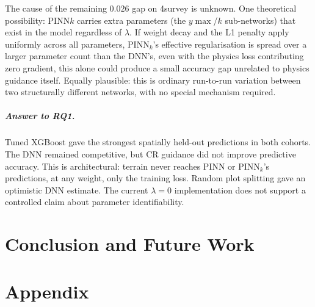 \documentclass[logo,msc,ai]{infthesis}           %
\begin{document}
The cause of the remaining $0.026$ gap on 4survey is unknown. One theoretical possibility: PINN$k$ carries extra parameters (the $y{\max}$/$k$ sub-networks) that exist in the model regardless of $\lambda$. If weight decay and the L1 penalty apply uniformly across all parameters, PINN$_k$'s effective regularisation is spread over a larger parameter count than the DNN's, even with the physics loss contributing zero gradient, this alone could produce a small accuracy gap unrelated to physics guidance itself. Equally plausible: this is ordinary run-to-run variation between two structurally different networks, with no special mechanism required. 

\paragraph*{Answer to RQ1.}
Tuned XGBoost gave the strongest spatially held-out predictions in both cohorts. The DNN remained competitive, but CR guidance did not improve predictive accuracy. This is architectural: terrain never reaches PINN or PINN$_k$'s predictions, at any weight, only the training loss. Random plot splitting gave an optimistic DNN estimate. The current $\lambda=0$ implementation does not support a controlled claim about parameter identifiability.






\chapter{Conclusion and Future Work} \label{ch:conc}




\appendix
\chapter{Appendix}  \label{chap:appendix} 



\end{document}
